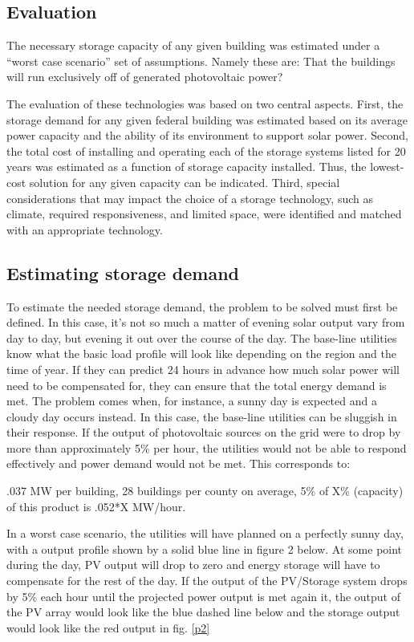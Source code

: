 \subsection{Evaluation}
The necessary storage capacity of any given building was estimated under a
``worst case scenario'' set of assumptions. Namely these are:
That the buildings will run exclusively off of generated photovoltaic power?

The evaluation of these technologies was based on two central aspects. First,
the storage demand for any given federal building was estimated based on its
average power capacity and the ability of its environment to support solar
power. Second, the total cost of installing and operating each of the storage
systems listed for 20 years was estimated as a function of storage capacity
installed. Thus, the lowest-cost solution for any given capacity can be
indicated. Third, special considerations that may impact the choice of a
storage technology, such as climate, required responsiveness, and limited
space, were identified and matched with an appropriate technology.

\subsection{Estimating storage demand}

To estimate the needed storage demand, the problem to be solved must first be
defined. In this case, it’s not so much a matter of evening solar output vary
from day to day, but evening it out over the course of the day. The base-line
utilities know what the basic load profile will look like depending on the
region and the time of year. If they can predict 24 hours in advance how much
solar power will need to be compensated for, they can ensure that the total
energy demand is met. The problem comes when, for instance, a sunny day is
expected and a cloudy day occurs instead. In this case, the base-line utilities
can be sluggish in their response. If the output of photovoltaic sources on the
grid were to drop by more than approximately 5\% per hour, the utilities would
not be able to respond effectively and power demand would not be met. This corresponds to:

.037 MW per building, 28 buildings per county on average, 5\% of X\% (capacity)
of this product is .052*X MW/hour.

In a worst case scenario, the utilities will have planned on a perfectly sunny
day, with a output profile shown by a solid blue line in figure 2 below. At
some point during the day, PV output will drop to zero and energy storage will
have to compensate for the rest of the day. If the output of the PV/Storage
system drops by 5\% each hour until the projected power output is met again it,
the output of the PV array would look like the blue dashed line below and the
storage output would look like the red output in fig. \ref{p2}

